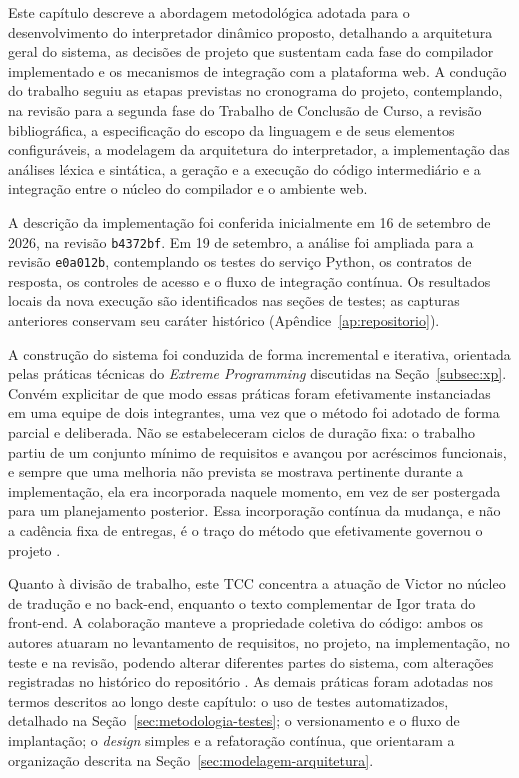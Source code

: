 
Este capítulo descreve a abordagem metodológica adotada para o desenvolvimento do interpretador dinâmico proposto, detalhando a arquitetura geral do sistema, as decisões de projeto que sustentam cada fase do compilador implementado e os mecanismos de integração com a plataforma web. A condução do trabalho seguiu as etapas previstas no cronograma do projeto, contemplando, na revisão para a segunda fase do Trabalho de Conclusão de Curso, a revisão bibliográfica, a especificação do escopo da linguagem e de seus elementos configuráveis, a modelagem da arquitetura do interpretador, a implementação das análises léxica e sintática, a geração e a execução do código intermediário e a integração entre o núcleo do compilador e o ambiente web.

A descrição da implementação foi conferida inicialmente em 16 de setembro de 2026, na revisão \texttt{b4372bf}. Em 19 de setembro, a análise foi ampliada para a revisão \texttt{e0a012b}, contemplando os testes do serviço Python, os contratos de resposta, os controles de acesso e o fluxo de integração contínua. Os resultados locais da nova execução são identificados nas seções de testes; as capturas anteriores conservam seu caráter histórico (Apêndice~\ref{ap:repositorio}).

A construção do sistema foi conduzida de forma incremental e iterativa, orientada pelas práticas técnicas do \textit{Extreme Programming} discutidas na Seção~\ref{subsec:xp}. Convém explicitar de que modo essas práticas foram efetivamente instanciadas em uma equipe de dois integrantes, uma vez que o método foi adotado de forma parcial e deliberada. Não se estabeleceram ciclos de duração fixa: o trabalho partiu de um conjunto mínimo de requisitos e avançou por acréscimos funcionais, e sempre que uma melhoria não prevista se mostrava pertinente durante a implementação, ela era incorporada naquele momento, em vez de ser postergada para um planejamento posterior. Essa incorporação contínua da mudança, e não a cadência fixa de entregas, é o traço do método que efetivamente governou o projeto \cite{beck2004,wildt2015}.

Quanto à divisão de trabalho, este TCC concentra a atuação de Victor no núcleo de tradução e no back-end, enquanto o texto complementar de Igor trata do front-end. A colaboração manteve a propriedade coletiva do código: ambos os autores atuaram no levantamento de requisitos, no projeto, na implementação, no teste e na revisão, podendo alterar diferentes partes do sistema, com alterações registradas no histórico do repositório \cite{wildt2015}. As demais práticas foram adotadas nos termos descritos ao longo deste capítulo: o uso de testes automatizados, detalhado na Seção~\ref{sec:metodologia-testes}; o versionamento e o fluxo de implantação; o \textit{design} simples e a refatoração contínua, que orientaram a organização descrita na Seção~\ref{sec:modelagem-arquitetura}.

